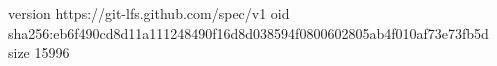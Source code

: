 version https://git-lfs.github.com/spec/v1
oid sha256:eb6f490cd8d11a111248490f16d8d038594f0800602805ab4f010af73e73fb5d
size 15996
